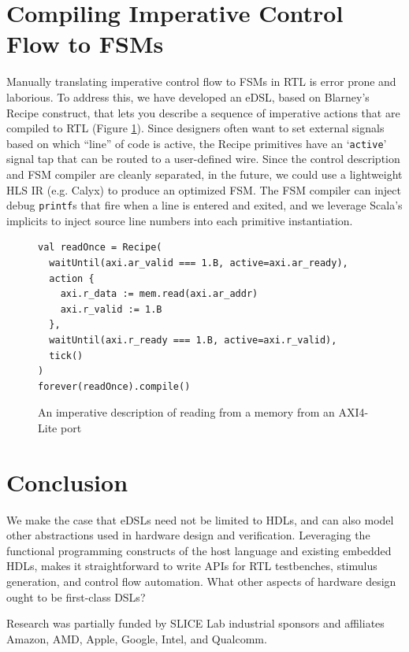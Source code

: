 \documentclass[sigplan,review,nonacm,9pt]{acmart}
\begin{document}
\section{Compiling Imperative Control Flow to FSMs}

Manually translating imperative control flow to FSMs in RTL is error prone and laborious.
To address this, we have developed an eDSL\cite{chisel_recipes}, based on Blarney's Recipe construct\cite{blarney}, that lets you describe a sequence of imperative actions that are compiled to RTL (Figure \ref{fig:recipes}).
Since designers often want to set external signals based on which ``line'' of code is active, the Recipe primitives have an `\texttt{active}' signal tap that can be routed to a user-defined wire.
Since the control description and FSM compiler are cleanly separated, in the future, we could use a lightweight HLS IR (e.g. Calyx\cite{calyx}) to produce an optimized FSM.
The FSM compiler can inject debug \texttt{printf}s that fire when a line is entered and exited, and we leverage Scala's implicits\cite{sourcecode} to inject source line numbers into each primitive instantiation.

\begin{figure}
\begin{verbatim}
val readOnce = Recipe(
  waitUntil(axi.ar_valid === 1.B, active=axi.ar_ready),
  action {
    axi.r_data := mem.read(axi.ar_addr)
    axi.r_valid := 1.B
  },
  waitUntil(axi.r_ready === 1.B, active=axi.r_valid),
  tick()
)
forever(readOnce).compile()
\end{verbatim}
\caption{An imperative description of reading from a memory from an AXI4-Lite port}
\label{fig:recipes}
\end{figure}

\section{Conclusion}


We make the case that eDSLs need not be limited to HDLs, and can also model other abstractions used in hardware design and verification.
Leveraging the functional programming constructs of the host language and existing embedded HDLs, makes it straightforward to write APIs for RTL testbenches, stimulus generation, and control flow automation.
What other aspects of hardware design ought to be first-class DSLs?

\begin{acks}
Research was partially funded by SLICE Lab industrial sponsors and affiliates Amazon, AMD, Apple, Google, Intel, and Qualcomm.
\end{acks}




\end{document}
